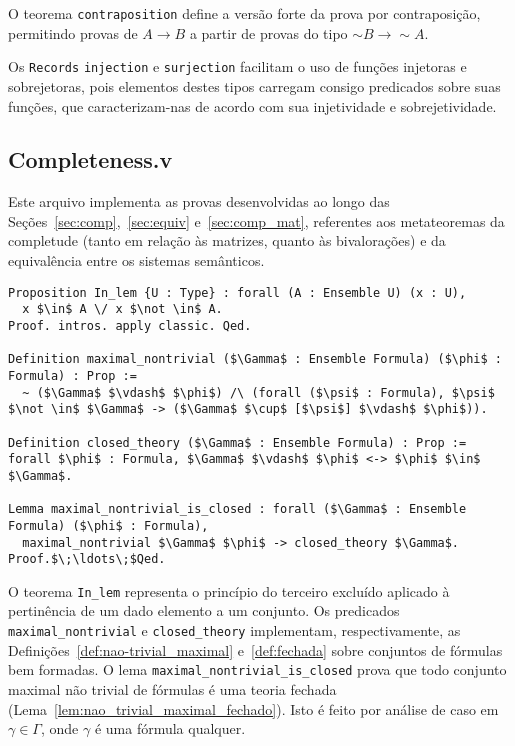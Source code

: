           O teorema \texttt{contraposition} define a versão forte da prova por contraposição, permitindo provas de $A \to B$ a partir de provas do tipo $\sim B \to \sim A$.
          
          Os \texttt{Records} \texttt{injection} e \texttt{surjection} facilitam o uso de funções injetoras e sobrejetoras, pois elementos destes tipos carregam consigo predicados sobre suas funções, que caracterizam-nas de acordo com sua injetividade e sobrejetividade.

    
    \subsection{Completeness.v}\label{sec:completeness}
        
        Este arquivo implementa as provas desenvolvidas ao longo das Seções~\ref{sec:comp},~\ref{sec:equiv} e~\ref{sec:comp_mat}, referentes aos metateoremas da completude (tanto em relação às matrizes, quanto às bivalorações) e da equivalência entre os sistemas semânticos.

        \begin{lstlisting}[name=Completeness, frame=single, language=coq]
Proposition In_lem {U : Type} : forall (A : Ensemble U) (x : U),
  x $\in$ A \/ x $\not \in$ A.
Proof. intros. apply classic. Qed.

Definition maximal_nontrivial ($\Gamma$ : Ensemble Formula) ($\phi$ : Formula) : Prop :=
  ~ ($\Gamma$ $\vdash$ $\phi$) /\ (forall ($\psi$ : Formula), $\psi$ $\not \in$ $\Gamma$ -> ($\Gamma$ $\cup$ [$\psi$] $\vdash$ $\phi$)).

Definition closed_theory ($\Gamma$ : Ensemble Formula) : Prop := 
forall $\phi$ : Formula, $\Gamma$ $\vdash$ $\phi$ <-> $\phi$ $\in$ $\Gamma$.

Lemma maximal_nontrivial_is_closed : forall ($\Gamma$ : Ensemble Formula) ($\phi$ : Formula),
  maximal_nontrivial $\Gamma$ $\phi$ -> closed_theory $\Gamma$.
Proof.$\;\ldots\;$Qed.
        \end{lstlisting}

        O teorema \texttt{In\_lem} representa o princípio do terceiro excluído aplicado à pertinência de um dado elemento a um conjunto. Os predicados \texttt{maximal\_nontrivial} e \texttt{closed\_theory} implementam, respectivamente, as Definições~\ref{def:nao-trivial_maximal} e~\ref{def:fechada} sobre conjuntos de fórmulas bem formadas. O lema \texttt{maximal\_nontrivial\_is\_closed} prova que todo conjunto maximal não trivial de fórmulas é uma teoria fechada (Lema~\ref{lem:nao_trivial_maximal_fechado}). Isto é feito por análise de caso em $\gamma \in \Gamma$, onde $\gamma$ é uma fórmula qualquer.

